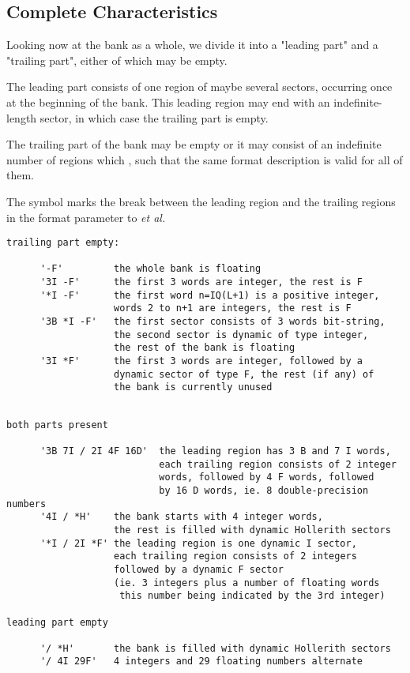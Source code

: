\subsection*{Complete Characteristics}

Looking now at the bank as a whole,
we divide it into a "leading part" and a "trailing part",
either of which may be empty.

The leading part consists of one region of maybe several sectors,
occurring once at the beginning of the bank.
This leading region may end with an indefinite-length sector,
in which case the trailing part is empty.

The trailing part of the bank may be empty or it may consist
of an indefinite number of regions which
,
such that the same format description is valid for all of them.

The symbol  marks the break between the leading region
and the trailing regions in the format parameter to  {\it et al.}

\Examples

\begin{verbatim}
trailing part empty:

      '-F'         the whole bank is floating
      '3I -F'      the first 3 words are integer, the rest is F
      '*I -F'      the first word n=IQ(L+1) is a positive integer,
                   words 2 to n+1 are integers, the rest is F
      '3B *I -F'   the first sector consists of 3 words bit-string,
                   the second sector is dynamic of type integer,
                   the rest of the bank is floating
      '3I *F'      the first 3 words are integer, followed by a
                   dynamic sector of type F, the rest (if any) of
                   the bank is currently unused
\end{verbatim} 

\begin{verbatim}

both parts present

      '3B 7I / 2I 4F 16D'  the leading region has 3 B and 7 I words,
                           each trailing region consists of 2 integer
                           words, followed by 4 F words, followed
                           by 16 D words, ie. 8 double-precision numbers
      '4I / *H'    the bank starts with 4 integer words,
                   the rest is filled with dynamic Hollerith sectors
      '*I / 2I *F' the leading region is one dynamic I sector,
                   each trailing region consists of 2 integers
                   followed by a dynamic F sector
                   (ie. 3 integers plus a number of floating words
                    this number being indicated by the 3rd integer)

leading part empty

      '/ *H'       the bank is filled with dynamic Hollerith sectors
      '/ 4I 29F'   4 integers and 29 floating numbers alternate
\end{verbatim} 

